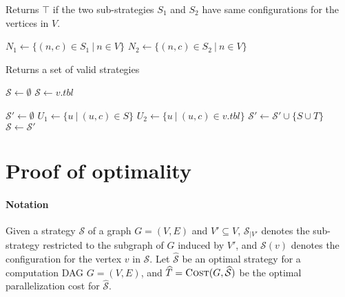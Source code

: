 \documentclass{article}
\newcommand{\strategy}{\mathcal{S}}
\newcommand{\optstrategy}{\widehat{\mathcal{S}}}
\newcommand{\optcost}{\widehat{T}}
\newcommand{\vertcost}[1]{t_V(#1)}
\newcommand{\edgecost}[1]{t_E(#1)}
\newcommand{\set}[1]{\{#1\}}
\begin{document}
\begin{algorithm}
	\caption{\label{alg:is-valid}Returns $\top$ if the two
	sub-strategies $S_1$ and $S_2$ have same configurations for the
	vertices in $V$.}

	\begin{algorithmic}[1]
			\State $N_1 \leftarrow \set{(n,c)\in S_1~|~n \in V}$
			\State $N_2 \leftarrow \set{(n,c)\in S_2~|~n \in V}$
			\Statex

				\State \Return{$\bot$}
			\EndIf
			\Statex
			\State \Return{$\top$}
		\EndProcedure
	\end{algorithmic}
\end{algorithm}


\begin{algorithm}
	\caption{\label{alg:valid-strategies} Returns a set of valid strategies}

	\begin{algorithmic}[1]

		\State $\strategy \leftarrow \emptyset$
			\If{$\strategy = \emptyset$}
				\State $\strategy \leftarrow v.tbl$
				\State {}
			\EndIf

			\Statex

			\State $\strategy' \leftarrow \emptyset$
			\ForAll{$S \in \strategy$}
					\State $U_1 \leftarrow \set{u~|~(u,c)\in S}$
					\State $U_2 \leftarrow \set{u~|~(u,c)\in v.tbl}$
					\Statex
						\State $\strategy' \leftarrow \strategy' \cup \set{S\cup T}$
					\EndIf
				\EndFor
			\EndFor
			\State $\strategy \leftarrow \strategy'$
		\EndFor

		\Statex
		\State\Return{$\strategy$}

		\EndProcedure

	\end{algorithmic}
\end{algorithm}

\clearpage

\section{Proof of optimality}
\paragraph{Notation}
Given a strategy $\strategy$ of a graph $G=(V,E)$ and $V'\subseteq V$,
$\strategy_{|V'}$ denotes the sub-strategy restricted to the subgraph of $G$
induced by $V'$, and $\strategy(v)$ denotes the configuration for the vertex $v$
in $\strategy$.  
Let $\optstrategy$ be an optimal strategy for a computation DAG
$G=(V,E)$, and $\optcost = \Call{Cost}{G, \optstrategy}$
be the optimal parallelization cost for $\optstrategy$.
\end{document}
